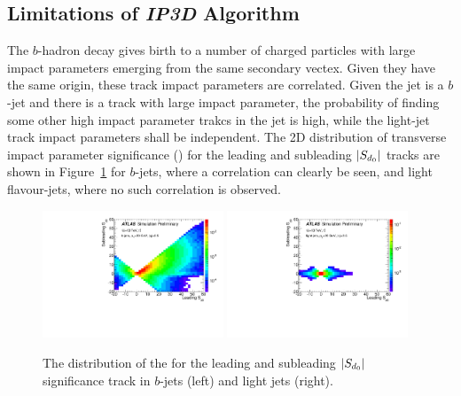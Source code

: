 \subsection{Limitations of \textit{IP3D} Algorithm}

The $b$-hadron decay gives birth to a number of charged particles with large impact parameters emerging from the same secondary vectex. Given they have the same origin, these track impact parameters are correlated. Given the jet is a $b$-jet and there is a track with large impact parameter, the probability of finding some other high impact parameter trakcs in the jet is high, while the light-jet track impact parameters shall be independent. The 2D distribution of transverse impact parameter significance (\sdip) for the leading and subleading $|S_{d{_0}}|$ tracks are shown in Figure~\ref{fig:ip_corr} for $b$-jets, where a correlation can clearly be seen, and light flavour-jets, where no such correlation is observed.

\begin{figure}[htbp]
  \centering
   \includegraphics[width=0.48\textwidth]{figures/RNN/Sd0_2d_B.pdf}
 \includegraphics[width=0.48\textwidth]{figures/RNN/Sd0_2d_L.pdf}
\caption{The distribution of the \sdip for the leading and subleading $|S_{d{_0}}|$ significance track in $b$-jets (left) and light jets (right). }
  \label{fig:ip_corr}
\end{figure}


